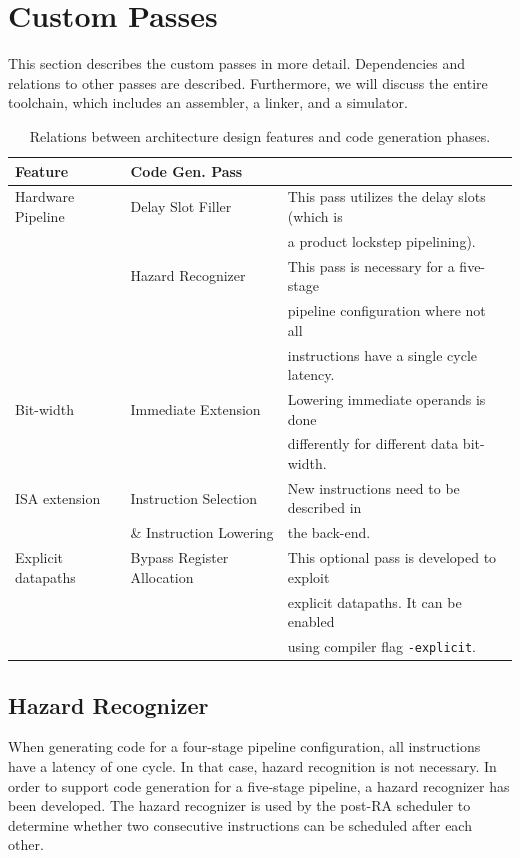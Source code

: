 \section{Custom Passes}
This section describes the custom passes in more detail. Dependencies and relations to other passes are described. Furthermore, we will discuss the entire toolchain, which includes an assembler, a linker, and a simulator. 

\begin{table}[t!]
\caption{Relations between architecture design features and code generation phases.}
\begin{center}
\begin{tabular}{@{}l l l@{}}
\toprule
\textbf{Feature} & \textbf{Code Gen. Pass} \\ \hline
Hardware Pipeline 	& Delay Slot Filler 		& This pass utilizes the delay slots (which is\\
				&					& a product lockstep pipelining).\\
			 	& Hazard Recognizer 	& This pass is necessary for a five-stage \\
				&					& pipeline configuration where not all\\
				&					& instructions have a single cycle latency.\\
Bit-width 			& Immediate Extension 	& Lowering immediate operands is done\\
				&				    	& differently for different data bit-width. \\
ISA extension		& Instruction Selection 	& New instructions need to be described in\\
				& \& Instruction Lowering	& the back-end. \\
Explicit datapaths 	& Bypass Register Allocation & This optional pass is developed to exploit\\
				&					& explicit datapaths. It can be enabled\\
				&					& using compiler flag \texttt{-explicit}. \\
\bottomrule
\end{tabular}
\end{center}
\label{table:rel_feature_pass}
\end{table}%

\subsection{Hazard Recognizer}\label{sec:hazard_recogn}
When generating code for a four-stage pipeline configuration, all instructions have a latency of one cycle. In that case, hazard recognition is not necessary.
In order to support code generation for a five-stage pipeline, a hazard recognizer has been developed. The hazard recognizer is used by the post-RA scheduler to determine whether two consecutive instructions can be scheduled after each other. 

